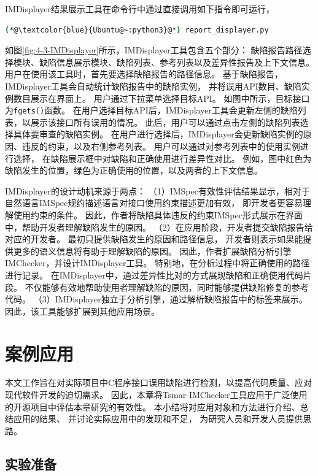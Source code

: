 IMDisplayer结果展示工具在命令行中通过直接调用如下指令即可运行，
\begin{lstlisting}[language={bash},
basicstyle=\linespread{0.8}\listingsfont,
numbers=none,
xleftmargin=.3\textwidth]
(*@\textcolor{blue}{Ubuntu@~:python3}@*) report_displayer.py
\end{lstlisting}
如图\ref{fig:4-3-IMDisplayer}所示，IMDisplayer工具包含五个部分：
缺陷报告路径选择模块、缺陷信息展示模块、缺陷列表、参考列表以及差异性报告及上下文信息。
用户在使用该工具时，首先要选择缺陷报告的路径信息。
基于缺陷报告，IMDisplayer工具会自动统计缺陷报告中的缺陷实例，
并将误用API数目、缺陷实例数目展示在界面上。
用户通过下拉菜单选择目标API。
如图中所示，目标接口为\texttt{fgets()}函数。
在用户选择目标API后，IMDisplayer工具会更新左侧的缺陷列表，以展示该接口所有误用的情况。
此后，用户可以通过点击左侧的缺陷列表选择具体要审查的缺陷实例。
在用户进行选择后，IMDisplayer会更新缺陷实例的原因、违反的约束，以及右侧参考列表。
用户可以通过对参考列表中的使用实例进行选择，
在缺陷展示框中对缺陷和正确使用进行差异性对比。
例如，图中红色为缺陷发生的位置，绿色为正确使用的位置，以及两者的上下文信息。

IMDisplayer的设计动机来源于两点：
（1）IMSpec有效性评估结果显示，相对于自然语言IMSpec规约描述语言对接口使用约束描述更加有效，
即开发者更容易理解使用约束的条件。
因此，作者将缺陷具体违反的约束IMSpec形式展示在界面中，帮助开发者理解缺陷发生的原因。
（2）在应用阶段，开发者提交缺陷报告给对应的开发者。
最初只提供缺陷发生的原因和路径信息，
开发者则表示如果能提供更多的语义信息将有助于理解缺陷的原因。
因此，作者扩展缺陷分析引擎IMChecker，并设计IMDisplayer工具。
特别地，在分析过程中将正确使用的路径进行记录。
在IMDisplayer中，通过差异性比对的方式展现缺陷和正确使用代码片段。
不仅能够有效地帮助使用者理解缺陷的原因，同时能够提供缺陷修复的参考代码。
（3）IMDisplayer独立于分析引擎，通过解析缺陷报告中的标签来展示。
因此，该工具能够扩展到其他应用场景。

\section{案例应用}
\label{sec:4.4}
本文工作旨在对实际项目中C程序接口误用缺陷进行检测，以提高代码质量、应对现代软件开发的迫切需求。
因此，本章将Tsmar-IMChecker工具应用于广泛使用的开源项目中评估本章研究的有效性。
本小结将对应用对象和方法进行介绍、总结应用的结果、
并讨论实际应用中的发现和不足，
为研究人员和开发人员提供思路。

\subsection{实验准备}
